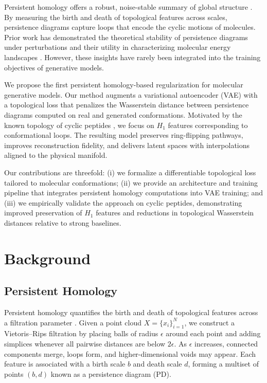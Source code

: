 \documentclass[11pt]{article}
\begin{document}
Persistent homology offers a robust, noise-stable summary of global structure \cite{edelsbrunner2010computational, carlsson2009topology}. By measuring the birth and death of topological features across scales, persistence diagrams capture loops that encode the cyclic motions of molecules. Prior work has demonstrated the theoretical stability of persistence diagrams under perturbations \cite{cohen2007stability} and their utility in characterizing molecular energy landscapes \cite{carlsson2009topology, sommers2023tda}. However, these insights have rarely been integrated into the training objectives of generative models.

We propose the first persistent homology-based regularization for molecular generative models. Our method augments a variational autoencoder (VAE) with a topological loss that penalizes the Wasserstein distance between persistence diagrams computed on real and generated conformations. Motivated by the known topology of cyclic peptides \cite{wales2001microscopic, shaw2010atomic}, we focus on $H_1$ features corresponding to conformational loops. The resulting model preserves ring-flipping pathways, improves reconstruction fidelity, and delivers latent spaces with interpolations aligned to the physical manifold.

Our contributions are threefold: (i) we formalize a differentiable topological loss tailored to molecular conformations; (ii) we provide an architecture and training pipeline that integrates persistent homology computations into VAE training; and (iii) we empirically validate the approach on cyclic peptides, demonstrating improved preservation of $H_1$ features and reductions in topological Wasserstein distances relative to strong baselines.

\section{Background}
\subsection{Persistent Homology}
Persistent homology quantifies the birth and death of topological features across a filtration parameter \cite{edelsbrunner2010computational, carlsson2009topology}. Given a point cloud $X = \{x_i\}_{i=1}^N$, we construct a Vietoris--Rips filtration by placing balls of radius $\epsilon$ around each point and adding simplices whenever all pairwise distances are below $2\epsilon$. As $\epsilon$ increases, connected components merge, loops form, and higher-dimensional voids may appear. Each feature is associated with a birth scale $b$ and death scale $d$, forming a multiset of points $(b, d)$ known as a persistence diagram (PD).
\end{document}
